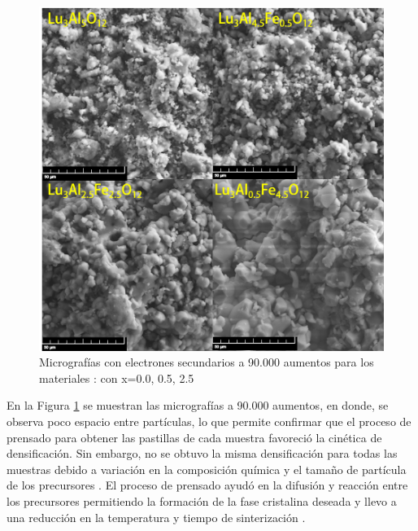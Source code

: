 \begin{figure}[h]
    \centering%

    \includegraphics[width=12cm]{Kap5/sec20k.png}%
    \caption{Micrografías con electrones secundarios a 90.000 aumentos para los
    materiales : con x=0.0, 0.5, 2.5
    }\label{fig:sec90}
\end{figure}

En la Figura \ref{fig:sec90} se muestran las micrografías a 90.000 aumentos, en donde, se
observa poco espacio entre partículas, lo que permite confirmar que el proceso
de prensado para obtener las pastillas de cada muestra favoreció la cinética de
densificación. Sin embargo, no se obtuvo la misma densificación para todas las
muestras debido a variación en la composición química y el tamaño de partícula
de los precursores \cite{MoralesRivera2019}. El proceso de prensado ayudó en la difusión y reacción
entre los precursores permitiendo la formación de la fase cristalina deseada y
llevo a una reducción en la temperatura y tiempo de sinterización \cite{Kang2005}.\\

